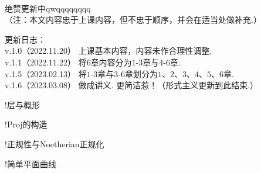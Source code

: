 \begin{center}
     \\ 绝赞更新中qwqqqqqqqq 
    \\ （注：本文内容忠于上课内容，但不忠于顺序，并会在适当处做补充.）

\end{center}

\begin{flushleft}
    更新日志： \\
    v.1.0（2022.11.20） 上课基本内容，内容未作合理性调整. \\
    v.1.1（2022.11.22） 将$6$章内容分为$1$-$3$章与$4$-$6$章. \\
    v.1.5（2023.02.13） 将$1$-$3$章与$3$-$6$章划分为$1$、$2$、$3$、$4$、$5$、$6$章. \\
    v.1.6（2023.03.08） 做成讲义. 更简洁惹！（形式主义更新到此结束.）
\end{flushleft}

\begin{structure}


    \subpage!{层与概形}


    \subpage!{Proj的构造}




    \subpage!{正规性与Noetherian正规化}



    \subpage!{简单平面曲线}

\end{structure}